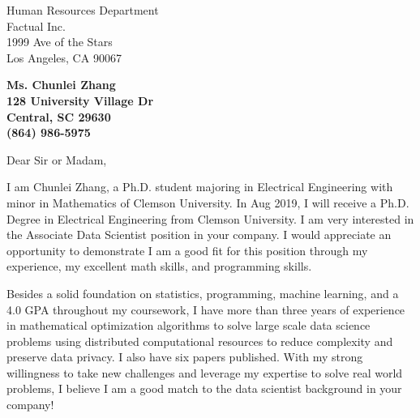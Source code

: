 \documentclass[11pt]{letter} %
\begin{document}

\begin{letter}{Human Resources Department \\
		Factual Inc. \\
1999 Ave of the Stars\\ Los Angeles, CA 90067} 



\begin{center}
\large\bf Ms. Chunlei Zhang \\ %
128 University Village Dr\\ Central, SC 29630 \\ (864) 986-5975%
\end{center} 
\vfill


\signature{Chunlei Zhang} %


\opening{Dear Sir or Madam,} 


I am Chunlei Zhang, a Ph.D. student majoring in Electrical Engineering with minor in Mathematics of Clemson University. In Aug 2019, I will receive a Ph.D. Degree in Electrical Engineering from Clemson University. I am very interested in the Associate Data Scientist position in your company. I would appreciate an opportunity to demonstrate I am a good fit for this position through my experience, my excellent math skills, and programming skills.


Besides a solid foundation on statistics, programming, machine learning, and a 4.0 GPA throughout my coursework, I have more than three years of experience in mathematical optimization algorithms to solve large scale data science problems using distributed computational resources to reduce complexity and preserve data privacy. I also have six papers published. With my strong willingness to take new challenges and leverage my expertise to solve real world problems, I believe I am a good match to the data scientist background in your company! 


\end{letter}
\end{document}
